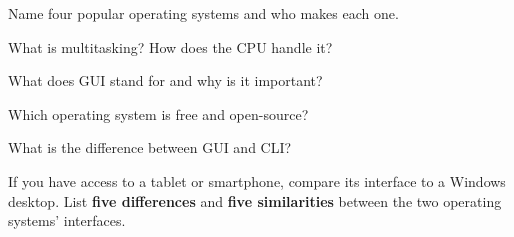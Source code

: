 \begin{reviewqs}
  \item Name four popular operating systems and who makes each one.
  \item What is multitasking? How does the CPU handle it?
  \item What does GUI stand for and why is it important?
  \item Which operating system is free and open-source?
  \item What is the difference between GUI and CLI?
\end{reviewqs}

\begin{challenge}
If you have access to a tablet or smartphone, compare its interface to a Windows desktop. List \textbf{five differences} and \textbf{five similarities} between the two operating systems' interfaces.
\end{challenge}
